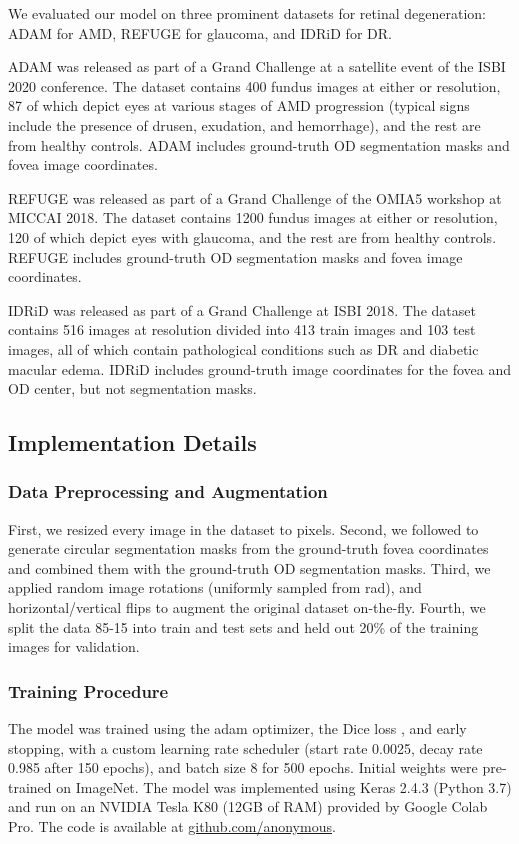 \documentclass[hidelinks,runningheads]{llncs}
\begin{document}
We evaluated our model on three prominent datasets for retinal degeneration: ADAM \cite{fu_adam_2020} for \ac{AMD}, REFUGE \cite{ORLANDO2020101570} for glaucoma, and IDRiD \cite{PORWAL2020101561} for \ac{DR}.


ADAM was released as part of a Grand Challenge at a satellite event of the ISBI 2020 conference.
The dataset contains 400 fundus images at either  or  resolution, 87 of which depict eyes at various stages of \ac{AMD} progression (typical signs include the presence of drusen, exudation, and hemorrhage), and the rest are from healthy controls.
ADAM includes ground-truth \ac{OD} segmentation masks and fovea image coordinates.

REFUGE was released as part of a Grand Challenge of the OMIA5 workshop at MICCAI 2018. The dataset contains 1200 fundus images at either  or   resolution, 120 of which depict eyes with glaucoma, and the rest are from healthy controls.
REFUGE includes ground-truth \ac{OD} segmentation masks and fovea image coordinates.

IDRiD was released as part of a Grand Challenge at ISBI 2018.
The dataset contains 516 images at  resolution divided into 413 train images and 103 test images, all of which contain pathological conditions such as \ac{DR} and diabetic macular edema.
IDRiD includes ground-truth image coordinates for the fovea and \ac{OD} center, but not segmentation masks.




\subsection{Implementation Details}

\subsubsection{Data Preprocessing and Augmentation}
First, we resized every image in the dataset to  pixels.
Second, we followed \cite{kamble_optic_2020} to generate circular segmentation masks from the ground-truth fovea coordinates and combined them with the ground-truth \ac{OD} segmentation masks.
Third, we applied random image rotations (uniformly sampled from  rad), and horizontal/vertical flips to augment the original dataset on-the-fly. Fourth, we split the data 85-15 into train and test sets and held out 20\% of the training images for validation.

\subsubsection{Training Procedure}
The model was trained using the adam optimizer, the Dice loss \cite{sudre_generalised_2017}, and early stopping, with a custom learning rate scheduler (start rate 0.0025, decay rate 0.985 after 150 epochs), and batch size 8 for 500 epochs.
Initial weights were pre-trained on ImageNet.
The model was implemented using Keras 2.4.3 (Python 3.7) and run on an NVIDIA Tesla K80 (12GB of RAM) provided by Google Colab Pro.
The code is available at \url{github.com/anonymous}.
\end{document}
